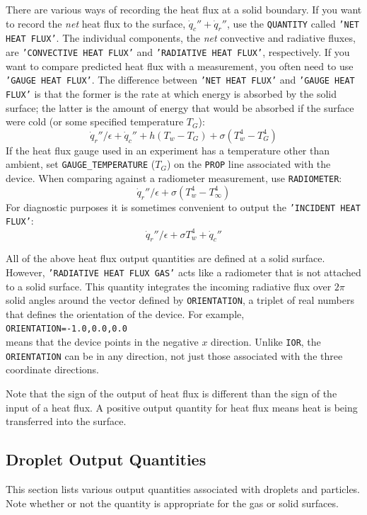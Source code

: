 \documentclass[11pt]{book}
\newcommand{\ct}{\tt\small}
\newcommand{\dq}{\dot{q}}
\begin{document}
There are various ways of recording the heat flux at a solid
boundary. If you want to record the {\em net} heat flux to the
surface, $\dq_c'' + \dq_r''$, use the {\ct QUANTITY} called {\ct 'NET HEAT FLUX'}. The individual components, the {\em net} convective and
radiative fluxes, are {\ct 'CONVECTIVE HEAT FLUX'} and {\ct 'RADIATIVE HEAT FLUX'}, respectively. If you want to compare predicted heat
flux with a measurement, you often need to use {\ct 'GAUGE HEAT FLUX'}.
The difference between {\ct 'NET HEAT FLUX'} and {\ct 'GAUGE HEAT FLUX'} is that
the former is the rate at which energy is absorbed by the solid surface;
the latter is the amount of energy that would be absorbed if the surface were cold (or some specified temperature $T_G$):
$$\dq_r''/\epsilon +\dq_c'' + h(T_w-T_G) + \sigma (T_w^4-T_G^4)$$
If the heat flux gauge used in an experiment has a temperature other
than ambient, set {\ct GAUGE\_TEMPERATURE} ($T_G$) on the {\ct PROP} line
associated with the device.  When comparing against a radiometer
measurement, use {\ct RADIOMETER}:
$$\dq_r''/\epsilon + \sigma (T_w^4-T_\infty^4) $$
For diagnostic purposes it is sometimes convenient to output the {\ct 'INCIDENT HEAT FLUX'}:
$$ \dq_r''/\epsilon + \sigma T_w^4 +\dq_c'' $$

All of the above heat flux output quantities are defined at a solid surface.
However, {\ct 'RADIATIVE HEAT FLUX GAS'} acts like a radiometer that is not attached to a solid surface.
This quantity integrates the incoming radiative flux over $2\pi$ solid angles around the
vector defined by {\ct ORIENTATION}, a triplet of real numbers that defines the orientation of the device. For example, \\ {\ct ORIENTATION=-1.0,0.0,0.0} \\
means that the device points in the negative $x$ direction. Unlike {\ct IOR}, the {\ct ORIENTATION} can be in any direction, not just those associated with
the three coordinate directions.

Note that the sign of the output of heat flux is different than the sign of the input of a heat flux.  A positive
output quantity for heat flux means heat is being transferred into the surface.

\subsection{Droplet Output Quantities}
\label{info:part_output}

This section lists various output quantities associated with droplets and particles. Note whether or not the quantity is appropriate for the gas or
solid surfaces.
\end{document}
